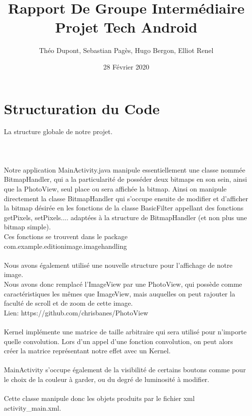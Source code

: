 \documentclass[12pt]{article}
\title{
    {\myfont Rapport De Groupe Intermédiaire} \\
    \bigskip
    Projet Tech Android
    }
\author{Théo Dupont, Sebastian Pagès, Hugo Bergon, Elliot Renel}
\date{28 Février 2020}
\begin{document}
\maketitle
\bigskip
\bigskip
\bigskip

\tableofcontents

\section{Structuration du Code}
    La structure globale de notre projet.\\
    \\
    \\
    \\
    Notre application MainActivity.java manipule essentiellement une classe nommée BitmapHandler, qui a la particularité de posséder deux bitmaps en son sein, ainsi que la PhotoView,
    seul place ou sera affichée la bitmap. Ainsi on manipule directement la classe BitmapHandler qui s'occupe ensuite de modifier et d'afficher la bitmap désirée en 
    les fonctions de la classe BasicFilter appellant des fonctions getPixels, setPixels.... adaptées à la structure de BitmapHandler (et non plus une bitmap simple).\\
    Ces fonctions se trouvent dans le package com.example.editionimage.imagehandling\\
    \\
    Nous avons également utilisé une nouvelle structure pour l'affichage de notre image. \\
    Nous avons donc remplacé l'ImageView par une PhotoView, qui possède comme caractéristiques les mêmes que ImageView, 
    mais auquelles on peut rajouter la faculté de scroll et de zoom de cette image.\\
    Lien: https://github.com/chrisbanes/PhotoView\\
    \\
    Kernel implémente une matrice de taille arbitraire qui sera utilisé pour n'importe quelle convolution.
    Lors d'un appel d'une fonction convolution, on peut alors créer la matrice représentant notre effet avec un Kernel.\\
    \\
    MainActivity s'occupe également de la visibilité de certains boutons comme pour le choix de la couleur à garder, ou du degré de luminosité à modifier.\\
    \\
    Cette classe manipule donc les objets produits par le fichier xml activity\_main.xml.\\
\end{document}
